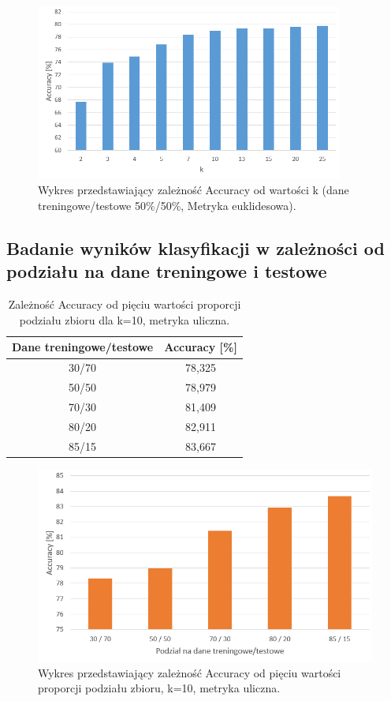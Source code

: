 \documentclass{classrep}
\begin{document}
\begin{figure}[h!]
	\centering
	\includegraphics[width=0.9\textwidth]{accuracyK.png}
	\caption{Wykres przedstawiający zależność Accuracy od wartości k (dane treningowe/testowe 50\%/50\%, Metryka euklidesowa).}
	\label{accuracyK}
\end{figure}

\newpage
\subsection{Badanie wyników klasyfikacji w zależności od podziału na dane treningowe i testowe}
\begin{table}[h!]
	\centering
	\begin{tabular} {c c}
		\hline
		\textbf{Dane treningowe/testowe} & \textbf{Accuracy [\%]} \\ [0.5ex] 
		\hline
		\hline 
		30/70 & 78,325 \\ 
		50/50 & 78,979 \\
		70/30 & 81,409 \\
		80/20 & 82,911 \\
		85/15 & 83,667 \\
		\hline
	\end{tabular}
	\caption{Zależność Accuracy od pięciu wartości proporcji podziału zbioru dla k=10, metryka uliczna. }
	\label{tabelaTT}
\end{table}

\begin{figure}[h!]
    \centering
    \includegraphics[width=1\textwidth]{accuracyTT.png}
    \caption{Wykres przedstawiający zależność Accuracy od pięciu wartości proporcji podziału zbioru, k=10, metryka uliczna.}
    \label{accuracyTT}
\end{figure}
\end{document}
